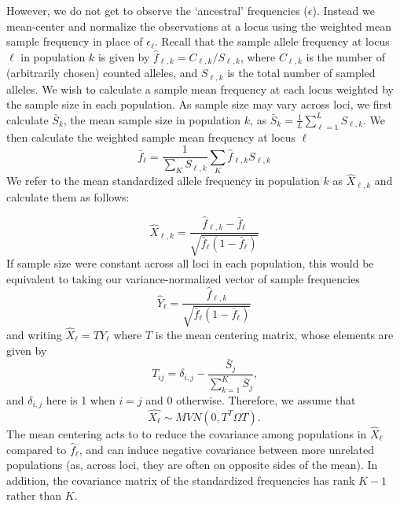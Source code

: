 \documentclass[12pt]{article}
\begin{document}
However, we do not get to observe the `ancestral' frequencies ($\epsilon$). 
Instead we mean-center and normalize the observations at a locus using the weighted mean sample frequency in place of $\epsilon_{\ell}$.
Recall that the sample allele frequency at locus $\ell$ in population $k$ is given by $\hat{f}_{\ell,k} = C_{\ell,k}/S_{\ell,k}$,  
where $C_{\ell,k}$ is the number of (arbitrarily chosen) counted alleles,
and $S_{\ell,k}$ is the total number of sampled alleles.
We wish to calculate a sample mean frequency at each locus weighted by the sample size in each population.  As sample size may vary across loci, we first calculate $\bar{S}_k$, the mean sample size in population $k$, as $\bar{S}_k = \frac{1}{L}\sum_{\ell=1}^L S_{\ell,k}$.  We then calculate the weighted sample mean frequency at locus $\ell$ 
%
\begin{equation}
\label{eq:sample_mean_freq}
\bar{f}_{\ell} = \frac{1}{\sum_K S_{\ell,k}} \sum_K \hat{f}_{\ell,k} S_{\ell,k}
\end{equation}
We refer to the mean standardized allele frequency in population $k$ as $\hat{X}_{\ell,k}$ and calculate them as follows:

\begin{equation}
\hat{X}_{\ell,k} = \frac{ \hat{f}_{\ell,k} - \bar{f}_{\ell} } {\sqrt{\bar{f}_{\ell}(1-\bar{f}_{\ell})}}
\end{equation}
%
If sample size were constant across all loci in each population, this would be equivalent to taking our variance-normalized vector of sample frequencies
\begin{equation}
\hat{Y}_{\ell} = \frac{ \hat{f}_{\ell,k} } {\sqrt{\bar{f}_{\ell}(1-\bar{f}_{\ell})}}
\end{equation}
and writing $\hat{X}_{\ell} = T Y_{\ell} $ where $T$ is the mean centering matrix, whose elements are given by
\begin{equation}
T_{ij} = \delta_{i,j}  -  \frac{\bar{S}_j}{\sum\limits_{k=1}^{K} \bar{S}_j	} \text{,}
\end{equation}
and $\delta_{i,j}$ here is 1 when $i=j$ and 0 otherwise.
Therefore, we assume that
\begin{equation}
\hat{X_{\ell}} \sim MVN(0, T^T \Omega T) \text{.}
\end{equation}
The mean centering acts to to reduce the covariance among populations in $\hat{X}_{\ell}$ compared to $\hat{f}_{\ell}$, and can induce negative covariance between more unrelated populations (as, across loci, they are often on opposite sides of the mean). In addition, the covariance matrix of the standardized frequencies has rank $K-1$ rather than $K$.
\end{document}
